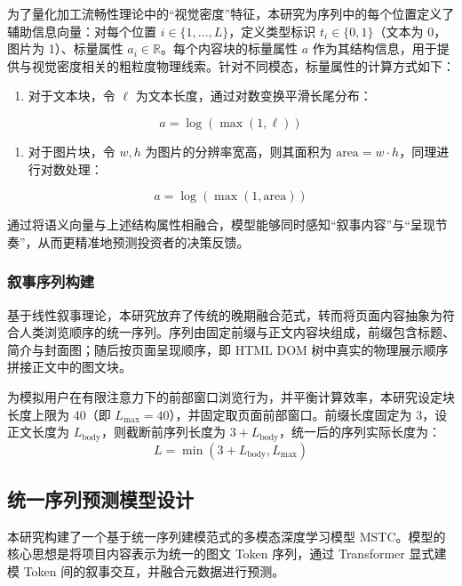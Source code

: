 为了量化加工流畅性理论中的``视觉密度''特征，本研究为序列中的每个位置定义了辅助信息向量：对每个位置 $ i\in\{1,\ldots,L\} $，定义类型标识 $ t_i\in\{0,1\} $（文本为 0，图片为 1）、标量属性 $ a_i\in\mathbb{R} $。每个内容块的标量属性 $ a $ 作为其结构信息，用于提供与视觉密度相关的粗粒度物理线索。针对不同模态，标量属性的计算方式如下：

\begin{enumerate}
\def\labelenumi{(\arabic{enumi})}
\item
  对于文本块，令 $ \ell $ 为文本长度，通过对数变换平滑长尾分布：
\end{enumerate}
\begin{equation}
a=\log(\max(1,\ell))
\end{equation}
\begin{enumerate}
\def\labelenumi{(\arabic{enumi})}
\setcounter{enumi}{1}
\item
  对于图片块，令 $ w,h $ 为图片的分辨率宽高，则其面积为 $ \text{area}=w\cdot h $，同理进行对数处理：
\end{enumerate}
\begin{equation}
a=\log(\max(1,\text{area}))
\end{equation}

通过将语义向量与上述结构属性相融合，模型能够同时感知``叙事内容''与``呈现节奏''，从而更精准地预测投资者的决策反馈。

\subsubsection{叙事序列构建}

基于线性叙事理论，本研究放弃了传统的晚期融合范式，转而将页面内容抽象为符合人类浏览顺序的统一序列。序列由固定前缀与正文内容块组成，前缀包含标题、简介与封面图；随后按页面呈现顺序，即 HTML DOM 树中真实的物理展示顺序拼接正文中的图文块。

为模拟用户在有限注意力下的前部窗口浏览行为，并平衡计算效率，本研究设定块长度上限为 40（即 $ L_{\max}=40 $），并固定取页面前部窗口。前缀长度固定为 3，设正文长度为 $ L_{\text{body}} $，则截断前序列长度为 $ 3+L_{\text{body}} $，统一后的序列实际长度为：
\begin{equation}
L=\min(3+L_{\text{body}},L_{\max})
\end{equation}

\subsection{统一序列预测模型设计}

本研究构建了一个基于统一序列建模范式的多模态深度学习模型 MSTC。模型的核心思想是将项目内容表示为统一的图文 Token 序列，通过 Transformer 显式建模 Token 间的叙事交互，并融合元数据进行预测。

